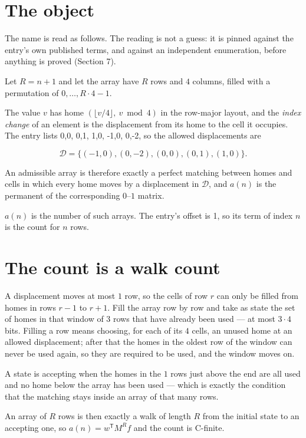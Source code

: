 \documentclass[11pt]{article}
\theoremstyle{definition}
\begin{document}
\section{The object}

The name is read as follows. The reading is not a guess: it is pinned against the entry's own published terms, and against an independent enumeration, before anything is proved (Section 7).

Let $R = n + 1$ and let the array have $R$ rows and $4$ columns, filled with a permutation of $0,\dots,R\cdot4-1$.

The value $v$ has home $(\lfloor v/4\rfloor,\ v \bmod 4)$ in the row-major layout, and the {\itshape index change} of an element is the displacement from its home to the cell it occupies. The entry lists 0,0, 0,1, 1,0, -1,0, 0,-2, so the allowed displacements are

\[\mathcal{D} = \{(-1,0), (0,-2), (0,0), (0,1), (1,0)\}.\]

An admissible array is therefore exactly a perfect matching between homes and cells in which every home moves by a displacement in $\mathcal{D}$, and $a(n)$ is the permanent of the corresponding $0$--$1$ matrix.

$a(n)$ is the number of such arrays. The entry's offset is 1, so its term of index $n$ is the count for $n$ rows.

\section{The count is a walk count}

A displacement moves at most $1$ row, so the cells of row $r$ can only be filled from homes in rows $r-1$ to $r+1$. Fill the array row by row and take as state the set of homes in that window of $3$ rows that have already been used --- at most $3\cdot4$ bits. Filling a row means choosing, for each of its $4$ cells, an unused home at an allowed displacement; after that the homes in the oldest row of the window can never be used again, so they are required to be used, and the window moves on.

A state is accepting when the homes in the $1$ rows just above the end are all used and no home below the array has been used --- which is exactly the condition that the matching stays inside an array of that many rows.

An array of $R$ rows is then exactly a walk of length $R$ from the initial state to an accepting one, so $a(n) = w^{\mathsf T}M^{R}f$ and the count is C-finite.
\end{document}
